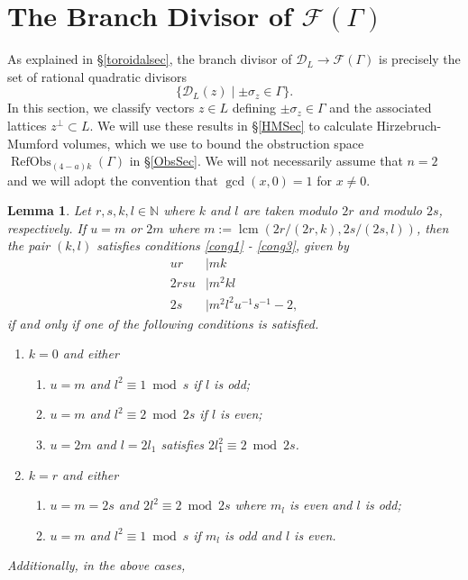 \documentclass[12pt, a4paper]{article}
\newtheorem{lemma}[thm]{Lemma}
\newcommand{\NN}{\mathbb{N}}
\newcommand{\dc}{\mathcal{D}}
\newcommand{\fc}{\mathcal{F}}
\newcommand{\opn}{\operatorname}
\begin{document}
 \section{The Branch Divisor of $\fc(\Gamma)$}\label{BranchSec}
As explained in \S\ref{toroidalsec}, the branch divisor of
$\dc_L \rightarrow \fc(\Gamma)$ is precisely the set of rational quadratic divisors
\[
\{ \dc_L(z) \mid \pm \sigma_z \in \Gamma \}.
\]
In this section, we classify vectors $z \in L$ defining $\pm \sigma_z \in \Gamma$ and the associated lattices $z^{\perp} \subset L$.
We will use these results in \S\ref{HMSec} to calculate Hirzebruch-Mumford volumes, which we use to bound the obstruction space $\opn{RefObs}_{(4-a)k}(\Gamma)$ in \S\ref{ObsSec}.
We will not necessarily assume that $n=2$ and we will adopt the convention that $\opn{gcd}(x, 0)=1$ for $x \neq 0$. 
\begin{lemma}\label{conglemma}
  Let $r, s, k, l \in \NN$ where $k$ and $l$ are taken modulo $2r$ and modulo $2s$, respectively. 
If $u=m$ or $2m$ where $m := \opn{lcm}(2r/(2r,k),2s/(2s,l))$,  then the pair $(k,l)$ satisfies conditions \eqref{cong1} - \eqref{cong3}, given by
  \begin{align}
    ur & \mid mk \label{cong1} \\
    2rsu & \mid m^2kl \label{cong2} \\
    2s & \mid m^2 l^2 u^{-1} s^{-1} - 2, \label{cong3} 
  \end{align}
  if and only if one of the following conditions is satisfied.
  \begin{enumerate}
  \item  $k =0$ and either
    \begin{enumerate}
    \item $u=m$ and $l^2 \equiv 1 \bmod{ s}$ if $l$ is odd;
    \item $u=m$ and $l^2 \equiv 2 \bmod{ 2s}$ if $l$ is even;
\item $u=2m$ and $l=2 l_1$ satisfies $2l_1^2 \equiv 2 \bmod{ 2s}$.
\end{enumerate}
  \item $k = r$ and either
    \begin{enumerate}
    \item $u=m=2s$ and $2l^2 \equiv 2 \bmod{ 2s}$ where $m_l$ is even and $l$ is odd; 
    \item $u=m$ and $l^2 \equiv 1 \bmod{ s}$ if $m_l$ is odd and $l$ is even.
\end{enumerate}
  \end{enumerate}
  Additionally, in the above cases,

\end{lemma}
\end{document}
